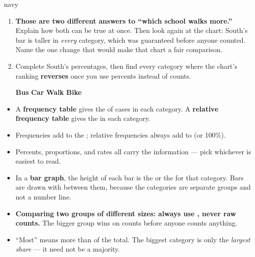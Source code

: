 \begin{scenariobox}{navy}
\begin{enumerate}[label=\textbf{\alph*.}, leftmargin=1.8em, itemsep=6pt]
\begin{work}
         &=  = 0.15 = 15\%
        \end{work}
        Which school has the \textbf{higher walking rate}? \blank{3.2cm}
  \item \textbf{Those are two different answers to ``which school walks more.''} Explain how
        both can be true at once. Then look again at the chart: South's bar is taller in
        \emph{every} category, which was guaranteed before anyone counted. Name the one change
        that would make that chart a fair comparison.
        \answerspace{2.8cm}{}
  \item Complete South's percentages, then find every category where the chart's ranking
        \textbf{reverses} once you use percents instead of counts.

        \vspace{2pt}
        \textbf{Bus} \blank{1.7cm} \quad \textbf{Car} \blank{1.7cm} \quad
        \textbf{Walk} \blank{1.7cm} \quad \textbf{Bike} \blank{1.7cm}
        \answerspace{1.8cm}{}
\end{enumerate}
\end{scenariobox}

\boxguard[14]
\begin{tcolorbox}[enhanced, colback=sky, colframe=navy, boxrule=0.8pt, arc=2mm,
    left=3mm, right=3mm, top=1.5mm, bottom=1.5mm, breakable,
    fonttitle=\bfseries\small\color{white}, title={QuickNotes: Tables and Graphs for a Categorical Variable},
    attach boxed title to top left={yshift=-2mm, xshift=4mm},
    boxed title style={colback=navy, colframe=navy, arc=1.5mm}]
\small
\begin{itemize}[leftmargin=1.1em, itemsep=4pt]
  \item A \textbf{frequency table} gives the \blank{2.0cm} of cases in each category. A
        \textbf{relative frequency table} gives the \blank{2.4cm} in each category.
  \item Frequencies add to the \blank{2.6cm}; relative frequencies always add to
        \blank{1.4cm} (or 100\%).
  \item Percents, proportions, and rates all carry the \blank{2.0cm} information --- pick
        whichever is easiest to read.
  \item In a \textbf{bar graph}, the height of each bar is the \blank{1.8cm} or the
        \blank{2.4cm} for that category. Bars are drawn with \blank{2.0cm} between them,
        because the categories are separate groups and not a number line.
  \item \textbf{Comparing two groups of different sizes: always use \blank{3.4cm}, never raw
        counts.} The bigger group wins on counts before anyone counts anything.
  \item ``Most'' means more than \blank{1.6cm} of the total. The biggest category is only the
        \emph{largest share} --- it need not be a majority.
\end{itemize}
\end{tcolorbox}

